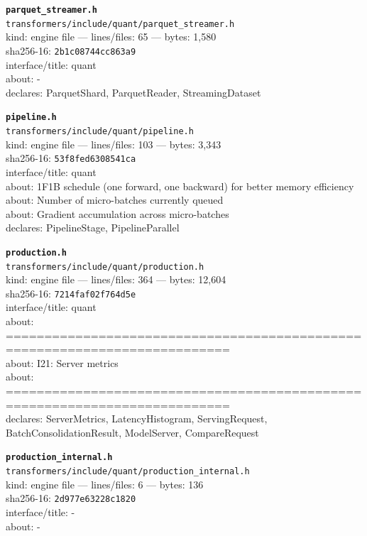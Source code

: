 \noindent\textbf{\texttt{parquet\_streamer.h}}\\
\texttt{transformers/include/quant/parquet\_streamer.h}\\
kind: engine file --- lines/files: 65 --- bytes: 1,580\\
sha256-16: \texttt{2b1c08744cc863a9}\\
interface/title: quant\\
about: -\\
declares: ParquetShard, ParquetReader, StreamingDataset\\
\vspace*{6.0pt}

\noindent\textbf{\texttt{pipeline.h}}\\
\texttt{transformers/include/quant/pipeline.h}\\
kind: engine file --- lines/files: 103 --- bytes: 3,343\\
sha256-16: \texttt{53f8fed6308541ca}\\
interface/title: quant\\
about: 1F1B schedule (one forward, one backward) for better memory efficiency\\
about: Number of micro-batches currently queued\\
about: Gradient accumulation across micro-batches\\
declares: PipelineStage, PipelineParallel\\
\vspace*{6.0pt}

\noindent\textbf{\texttt{production.h}}\\
\texttt{transformers/include/quant/production.h}\\
kind: engine file --- lines/files: 364 --- bytes: 12,604\\
sha256-16: \texttt{7214faf02f764d5e}\\
interface/title: quant\\
about: ===========================================================================\\
about: I21: Server metrics\\
about: ===========================================================================\\
declares: ServerMetrics, LatencyHistogram, ServingRequest, BatchConsolidationResult, ModelServer, CompareRequest\\
\vspace*{6.0pt}
\newpage

\noindent\textbf{\texttt{production\_internal.h}}\\
\texttt{transformers/include/quant/production\_internal.h}\\
kind: engine file --- lines/files: 6 --- bytes: 136\\
sha256-16: \texttt{2d977e63228c1820}\\
interface/title: -\\
about: -\\
\vspace*{6.0pt}

